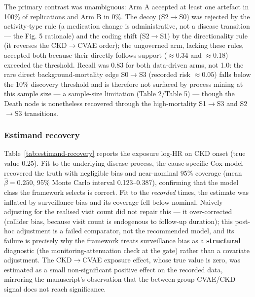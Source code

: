 \documentclass[sn-vancouver-num]{sn-jnl}
\begin{document}
The primary contrast was unambiguous: Arm A accepted at least one artefact in 100\% of replications and Arm B in 0\%. The decoy (S2$\rightarrow$S0) was rejected by the activity-type rule (a medication change is administrative, not a disease transition --- the Fig. 5 rationale) and the coding shift (S2$\rightarrow$S1) by the directionality rule (it reverses the CKD$\rightarrow$CVAE order); the ungoverned arm, lacking these rules, accepted both because their directly-follows support ($\approx$0.34 and $\approx$0.18) exceeded the threshold. Recall was 0.83 for both data-driven arms, not 1.0: the rare direct background-mortality edge S0$\rightarrow$S3 (recorded risk $\approx 0.05$) falls below the 10\% discovery threshold and is therefore not surfaced by process mining at this sample size --- a sample-size limitation (Table 2/Table 5) --- though the Death node is nonetheless recovered through the high-mortality S1$\rightarrow$S3 and S2$\rightarrow$S3 transitions.

\subsubsection{Estimand recovery}
Table~\ref{tab:estimand-recovery} reports the exposure log-HR on CKD onset (true value 0.25). Fit to the underlying disease process, the cause-specific Cox model recovered the truth with negligible bias and near-nominal 95\% coverage (mean $\hat{\beta} = 0.250$, 95\% Monte Carlo interval 0.123--0.387), confirming that the model class the framework selects is correct. Fit to the \textit{recorded} times, the estimate was inflated by surveillance bias and its coverage fell below nominal. Naively adjusting for the realised visit count did not repair this --- it over-corrected (collider bias, because visit count is endogenous to follow-up duration); this post-hoc adjustment is a failed comparator, not the recommended model, and its failure is precisely why the framework treats surveillance bias as a \textbf{structural} diagnostic (the monitoring-attenuation check at the gate) rather than a covariate adjustment. The CKD$\rightarrow$CVAE exposure effect, whose true value is zero, was estimated as a small non-significant positive effect on the recorded data, mirroring the manuscript's observation that the between-group CVAE/CKD signal does not reach significance.
\end{document}
